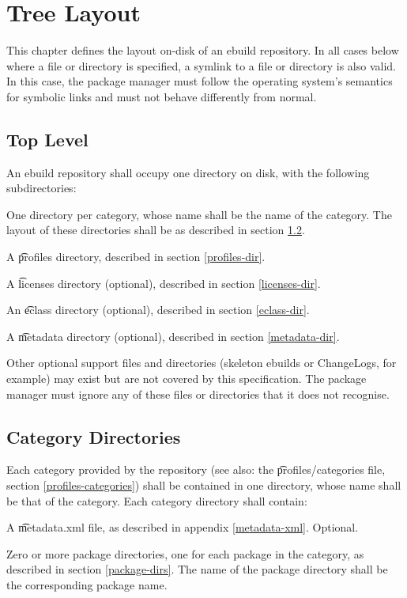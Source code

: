 \chapter{Tree Layout}

This chapter defines the layout on-disk of an ebuild repository. In all cases below where a file or
directory is specified, a symlink to a file or directory is also valid. In this case, the package
manager must follow the operating system's semantics for symbolic links and must not behave
differently from normal.

\section{Top Level}

An ebuild repository shall occupy one directory on disk, with the following subdirectories:
\begin{bulletlist}
\item One directory per category, whose name shall be the name of the category. The layout of
    these directories shall be as described in section \ref{category-dirs}.
\item A \t{profiles} directory, described in section \ref{profiles-dir}.
\item A \t{licenses} directory (optional), described in section \ref{licenses-dir}.
\item An \t{eclass} directory (optional), described in section \ref{eclass-dir}.
\item A \t{metadata} directory (optional), described in section \ref{metadata-dir}.
\item Other optional support files and directories (skeleton ebuilds or ChangeLogs,
    for example) may exist but are not covered by this specification. The package manager must
    ignore any of these files or directories that it does not recognise.

\end{bulletlist}

\section{Category Directories}
\label{category-dirs}

Each category provided by the repository (see also: the \t{profiles/categories} file, section
\ref{profiles-categories}) shall be contained in one directory, whose name shall be that of the
category. Each category directory shall contain:
\begin{bulletlist}
\item A \t{metadata.xml} file, as described in appendix \ref{metadata-xml}\@. Optional.
\item Zero or more package directories, one for each package in the category, as described in section
    \ref{package-dirs}. The name of the package directory shall be the corresponding package name.
\end{bulletlist}

